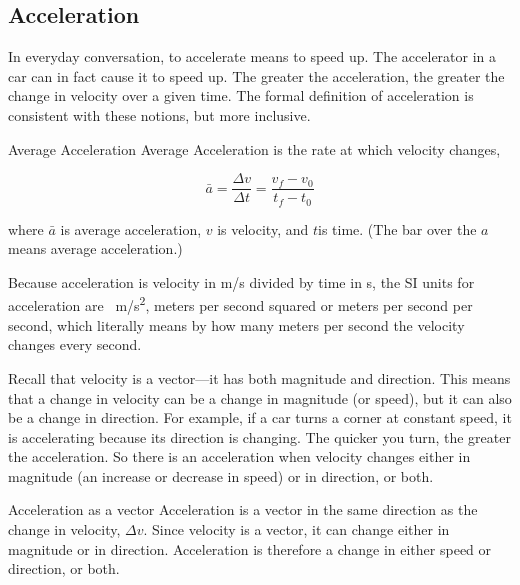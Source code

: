 \documentclass[../../main-ap-physics.tex]{subfiles}
\begin{document}
\subsection{Acceleration} \label{LgXYss}


In everyday conversation, to accelerate means to speed up. The accelerator in a car can in fact cause it to speed up. The greater the acceleration, the greater the change in velocity over a given time. The formal definition of acceleration is consistent with these notions, but more inclusive.

\begin{gradient}{Average Acceleration}
    Average Acceleration is the rate at which velocity changes,

    \begin{equation} \label{vdyjX5}
        \bar{a} = \frac{\Delta v}{\Delta t} = \frac{v_f - v_0}{t_f - t_0} 
    \end{equation}

    where $\bar{a}$ is average acceleration, $v$ is velocity, and $t$is time. (The bar over the $a$ means average acceleration.)
\end{gradient}

Because acceleration is velocity in m/s divided by time in s, the SI units for acceleration are \SI{}{m/s^2}, meters per second squared or meters per second per second, which literally means by how many meters per second the velocity changes every second.

\vspace{1em}

Recall that velocity is a vector---it has both magnitude and direction. This means that a change in velocity can be a change in magnitude (or speed), but it can also be a change in direction. For example, if a car turns a corner at constant speed, it is accelerating because its direction is changing. The quicker you turn, the greater the acceleration. So there is an acceleration when velocity changes either in magnitude (an increase or decrease in speed) or in direction, or both.

\begin{gradient}{Acceleration as a vector}
    Acceleration is a vector in the same direction as the change in velocity, $\Delta v$. Since velocity is a vector, it can change either in magnitude or in direction. Acceleration is therefore a change in either speed or direction, or both.
\end{gradient}
\end{document}
